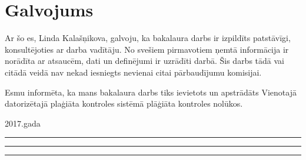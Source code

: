 \documentclass[12pt,paper=A4]{report}
\def\defAutors{Linda Kalašņikova}
\begin{document}
\chapter*{Galvojums}
\sloppy
{}
 
 Ar šo es, \defAutors, galvoju, ka bakalaura darbs ir izpildīts patstāvīgi, konsultējoties ar darba vadītāju. No svešiem pirmavotiem ņemtā informācija ir norādīta ar atsaucēm, dati un definējumi ir uzrādīti darbā. Šis darbs tādā vai citādā veidā nav nekad iesniegts nevienai citai pārbaudījumu komisijai. 
 
Esmu informēta, ka mans bakalaura darbs tiks ievietots un apstrādāts Vienotajā datorizētajā plaģiāta kontroles sistēmā plāģiāta kontroles nolūkos.
 
\vspace{1in}
2017.gada \rule{1cm}{0.2pt} \hspace{0.4cm}\rule{3cm}{0.2pt} \hspace{3.6cm}\rule{5cm}{0.2pt} \hspace*{12.5cm}\textit{}

\label{LastPage}
\end{document}
